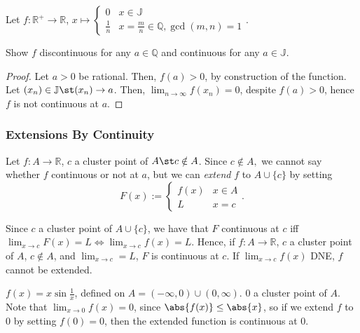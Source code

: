 \documentclass[12pt]{article}
\begin{document}
\begin{example}
  Let $f: \mathbb{R}^{+} \to \mathbb{R}$, $x \mapsto \begin{cases}
    0 & x \in \mathbb{J}\\
    \frac{1}{n} & x = \frac{m}{n} \in \mathbb{Q}, \gcd(m,n) = 1
  \end{cases}$.
  
  Show $f$ discontinuous for any $a \in \mathbb{Q}$ and continuous for any $a \in \mathbb{J}$.
  \begin{proof}
    Let $a > 0$ be rational. Then, $f(a) > 0$, by construction of the function. Let $(x_n) \in \mathbb{J} \st (x_n) \to a$. Then, $\lim_{n\to\infty} f(x_n) = 0$, despite $f(a) > 0$, hence $f$ is not continuous at $a$.
  \end{proof}
\end{example}


\subsubsection{Extensions By Continuity}

\begin{definition}
  Let $f: A \to \mathbb{R}$, $c$ a cluster point of $A \st c \notin A$. Since $c \notin A,$ we cannot say whether $f$ continuous or not at $a$, but we can \emph{extend} $f$ to $A \cup \{c\}$ by setting \[F(x) := \begin{cases}
    f(x) & x \in A \\
    L & x = c
  \end{cases}.\]
\end{definition}

\begin{remark}
  Since $c$ a cluster point of $A \cup \{c\}$, we have that $F$ continuous at $c$ iff $\lim_{x\to c}F(x) = L \iff \lim_{x\to c} f(x) = L$. Hence, if $f : A \to \mathbb{R}$, $c$ a cluster point of $A$, $c \notin A$, and $\lim_{x \to c} = L$, $F$ is continuous at $c$. If $\lim_{x\to c} f(x)$ DNE, $f$ cannot be extended.
\end{remark}

\begin{example}
  $f(x) = x \sin \frac{1}{x}$, defined on $A = (-\infty, 0)\cup(0,\infty)$. $0$ a cluster point of $A$. Note that $\lim_{x\to 0} f(x) = 0$, since $\abs{f(x)} \leq \abs{x}$, so if we extend $f$ to $0$ by setting $f(0) = 0$, then the extended function is continuous at $0$.
\end{example}
\end{document}
